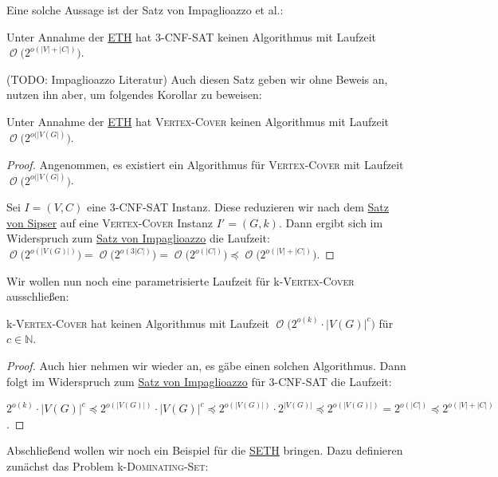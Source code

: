 \documentclass[a4paper,ngerman]{atseminar}
\newcommand{\N}{\ensuremath{\mathbb{N}}\xspace}
\newcommand{\BigO}[1]{\ensuremath{\operatorname{\mathcal{O}}\bigl(#1\bigr)}\xspace}
\begin{document}
\noindent
Eine solche Aussage ist der Satz von Impaglioazzo et al.:

\begin{theorem}
  \label{oe:theorem:impaglioazzo}
  Unter Annahme der \hyperref[oe:definition:eth]{ETH} hat 3-\textsc{CNF-SAT} keinen Algorithmus mit Laufzeit $\BigO{2^{o(|V|+|C|)}}$.
\end{theorem}
(TODO: Impaglioazzo Literatur)
\noindent
Auch diesen Satz geben wir ohne Beweis an, nutzen ihn aber, um folgendes Korollar zu beweisen:

\begin{corollary}
  Unter Annahme der \hyperref[oe:definition:eth]{ETH} hat \textsc{Vertex-Cover} keinen Algorithmus mit Laufzeit \BigO{2^{o(|V(G|)}}.
\end{corollary}
\begin{proof}
  Angenommen, es existiert ein Algorithmus für \textsc{Vertex-Cover} mit Laufzeit \BigO{2^{o(|V(G|)}}.
  
  \noindent
  Sei $I = (V, C)$ eine 3-\textsc{CNF-SAT} Instanz. Diese reduzieren wir nach dem \hyperref[oe:theorem:sipser]{Satz von Sipser} auf eine
  \textsc{Vertex-Cover} Instanz $I' = (G, k)$.
  Dann ergibt sich im Widerspruch zum \hyperref[oe:theorem:impaglioazzo]{Satz von Impaglioazzo} die Laufzeit:
  $\BigO{2^{o(|V(G)|)}} = \BigO{2^{o(3|C|)}} = \BigO{2^{o(|C|)}} \preceq \BigO{2^{o(|V| + |C|)}}$.
\end{proof}

\noindent
Wir wollen nun noch eine parametrisierte Laufzeit für k-\textsc{Vertex-Cover} ausschließen:

\begin{corollary}
  k-\textsc{Vertex-Cover} hat keinen Algorithmus mit Laufzeit \BigO{2^{o(k)} \cdot |V(G)|^{c}} für $c \in \N$.
\end{corollary}
\begin{proof}
  Auch hier nehmen wir wieder an, es gäbe einen solchen Algorithmus.
  Dann folgt im Widerspruch zum \hyperref[oe:theorem:impaglioazzo]{Satz von Impaglioazzo} für 3-\textsc{CNF-SAT} die Laufzeit:

  \noindent
  $2^{o(k)} \cdot |V(G)|^{c} \preceq 2^{o(|V(G)|)} \cdot |V(G)|^{c} \preceq 2^{o(|V(G)|)} \cdot 2^{|V(G)|} \preceq 2^{o(|V(G)|)} = 2^{o(|C|)} \preceq 2^{o(|V| + |C|)}$.
\end{proof}

\noindent
Abschließend wollen wir noch ein Beispiel für die \hyperref[oe:definition:seth]{SETH} bringen.
Dazu definieren zunächst das Problem k-\textsc{Dominating-Set}:
\end{document}
